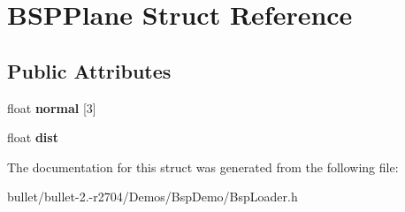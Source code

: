 \hypertarget{struct_b_s_p_plane}{\section{B\+S\+P\+Plane Struct Reference}
\label{struct_b_s_p_plane}
}
\subsection*{Public Attributes}
\begin{DoxyCompactItemize}
\item 
\hypertarget{struct_b_s_p_plane_a9473ef5707e5fe4aee2df2a24ac99882}{float {\bfseries normal} \mbox{[}3\mbox{]}}\label{struct_b_s_p_plane_a9473ef5707e5fe4aee2df2a24ac99882}

\item 
\hypertarget{struct_b_s_p_plane_ac8a6b63505df8ed624a719109cab66d0}{float {\bfseries dist}}\label{struct_b_s_p_plane_ac8a6b63505df8ed624a719109cab66d0}

\end{DoxyCompactItemize}


The documentation for this struct was generated from the following file\+:\begin{DoxyCompactItemize}
\item 
bullet/bullet-\/2.-\/r2704/\+Demos/\+Bsp\+Demo/Bsp\+Loader.\+h\end{DoxyCompactItemize}

